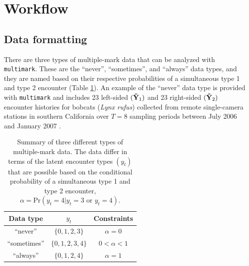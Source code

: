 \documentclass[12pt]{article}
\providecommand{\tabularnewline}{\\}
\begin{document}
\section{Workflow}
\subsection{Data formatting}
There are three types of multiple-mark data that can be analyzed with \verb|multimark|. These are the ``never'', ``sometimes'', and ``always'' data types, and they are named based on their respective probabilities of a simultaneous type 1 and type 2 encounter (Table \ref{tab:datatypes}). An example of the ``never'' data type is provided with \verb|multimark| and includes 23 left-sided $({\bf {\tilde Y}}_1)$ and 23 right-sided $({\bf {\tilde Y}}_2)$ encounter histories for bobcats ({\it Lynx rufus}) collected from remote single-camera stations in southern California over $T=8$ sampling periods between July 2006 and January 2007 \citep{McClintockEtAl2013a,AlonsoEtAl2015}. 

\begin{table}
  \caption{\label{tab:datatypes} Summary of three different types of multiple-mark data. The data differ in terms of the latent encounter types $(y_t)$ that are possible based on the conditional probability of a simultaneous type 1 and type 2 encounter, $\alpha = \text{Pr}\left( y_t=4|y_t=3 \text{ or } y_t=4 \right)$.}
  \begin{tabular}{c|cc}
  \hline 
  Data type & $y_t$ &  Constraints \tabularnewline
  \hline 
  ``never'' & $\{0,1,2,3\}$ & $\alpha=0$ \tabularnewline
  ``sometimes'' & $\{0,1,2,3,4\}$ & $0<\alpha<1$ \tabularnewline
  ``always'' & $\{0,1,2,4\}$ & $\alpha=1$ \tabularnewline
  \hline 
  \end{tabular}
\end{table}
\end{document}
